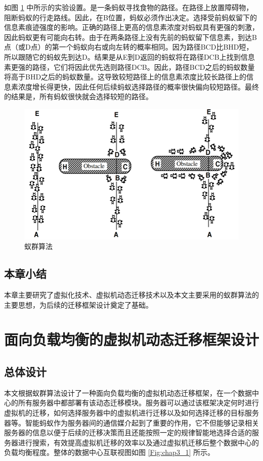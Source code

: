 如图 \ref{Fig:chap2_4} 中所示的实验设置。是一条蚂蚁寻找食物的路径。在路径上放置障碍物，阻断蚂蚁的行走路线。因此，在B位置，蚂蚁必须作出决定。选择受前蚂蚁留下的信息素痕迹强度的影响。正确的路径上更高的信息素浓度对蚂蚁具有更强的刺激，因此蚂蚁更有可能向右转。由于在两条路径上没有先前的蚂蚁留下信息素，到达B点（或D点）的第一个蚂蚁向右或向左转的概率相同。因为路径BCD比BHD短，所以跟随它的蚂蚁先到达D。结果是从E到D返回的蚂蚁将在路径DCB上找到信息素更强的路径，它们将因此优先选则路径DCB。因此，路径BCD之后的蚂蚁数量将高于BHD之后的蚂蚁数量。这导致较短路径上的信息素浓度比较长路径上的信息素浓度增长得更快，因此任何后续蚂蚁选择路径的概率很快偏向较短路径。最终的结果是，所有蚂蚁很快就会选择较短的路径。

\begin{figure}[!htb]
  \centering
  \includegraphics{./Figure/IMG_Chap2_4.png}
  \caption{蚁群算法}\label{Fig:chap2_4}
\end{figure}

\section{本章小结}
本章主要研究了虚拟化技术、虚拟机动态迁移技术以及本文主要采用的蚁群算法的主要思想，为后续的迁移框架设计奠定了基础。

\chapter{面向负载均衡的虚拟机动态迁移框架设计}

\section{总体设计}
本文根据蚁群算法设计了一种面向负载均衡的虚拟机动态迁移框架，在一个数据中心的所有服务器中都部署有该动态迁移模块。服务器可以通过该框架决定何时进行虚拟机的迁移，如何选择服务器中的虚拟机进行迁移以及如何选择迁移的目标服务器等。智能蚂蚁作为服务器间的通信媒介起到了重要的作用，它不但能够记录相关服务器的信息以便于后续的迁移决策而且还能按照一定的规律智能地选择合适的服务器进行搜索，有效提高虚拟机迁移的效率以及通过虚拟机迁移后整个数据中心的负载均衡程度。整体的数据中心互联视图如图 \ref{Fig:chap3_1} 所示。

